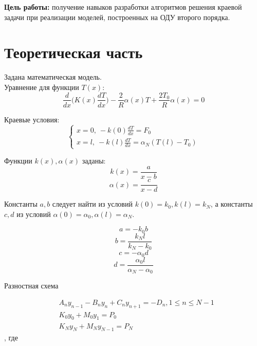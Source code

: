 \documentclass[a4paper, 14pt]{article}
\begin{document}
	\textbf{Цель работы:} получение навыков разработки  алгоритмов решения краевой задачи при реализации моделей, построенных на  ОДУ второго порядка.\\
	
	
	\section{Теоретическая часть}
	
Задана математическая модель.\\
Уравнение для функции  $T(x)$:\\
\begin{equation}
\frac{d}{dx}\bigg(K(x)\frac{dT}{dx}\bigg)-\frac{2}{R}\alpha(x)T+\frac{2T_0}{R}\alpha(x)=0
\end{equation}

Краевые условия:\\
\begin{equation}
 \begin{cases}
   x=0, ~-k(0)\frac{dT}{dx}=F_0
   \\
   x =l,~-k(l)\frac{dT}{dx}=\alpha_N(T(l)-T_0)
 \end{cases}
\end{equation}
 
 Функции $k(x), \alpha(x)$ заданы:
\begin{equation}
k(x)=\frac{a}{x-b}
\end{equation}
\begin{equation}
\alpha(x)=\frac{c}{x-d}
\end{equation}

Константы $a, b$  следует найти из условий $k(0) = k_0, k(l) = k_N$, а константы  $c, d$ из условий  $\alpha(0) = \alpha_0, \alpha(l)=\alpha_N$.

\begin{equation}
a = -k_0b
\end{equation}
\begin{equation}
b = \frac{k_Nl}{k_N-k_0}
\end{equation}
\begin{equation}
c = -\alpha_0d
\end{equation}
\begin{equation}
d = \frac{\alpha_0l}{\alpha_N-\alpha_0}
\end{equation}
 
 Разностная схема

\begin{equation}
\begin{aligned}
&A_ny_{n-1}-B_ny_n+C_ny_{n+1}=-D_n, 1\le n\le N-1\\
&K_0y_0+M_0y_1=P_0\\
&K_Ny_N+M_Ny_{N-1}=P_N
\end{aligned}
\end{equation}
, где
\end{document}
